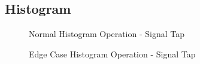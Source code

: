 \documentclass[12pt]{article}
\begin{document}
  \subsection{Histogram}
    \begin{figure}[H]
    \caption{Normal Histogram Operation - Signal Tap}
    \label{fig:norm_hist}
  \end{figure}
  
  \begin{figure}[H]
    \caption{Edge Case Histogram Operation - Signal Tap}
    \label{fig:edge_hist}
  \end{figure}
  
\end{document}
